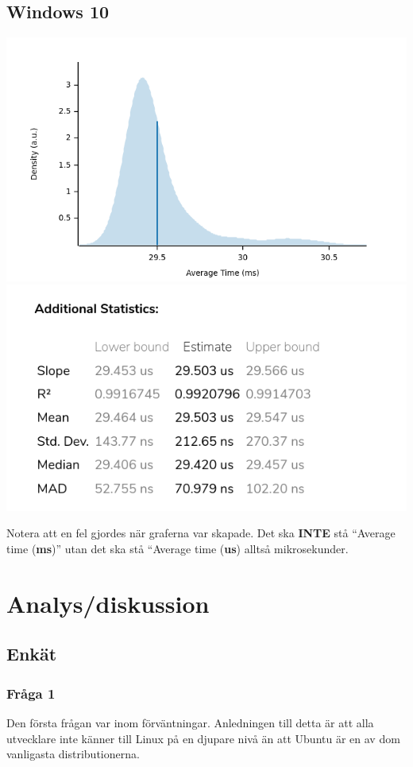 \documentclass[12pt, a4paper]{report}
\begin{document}
   \subsection{Windows 10}
   \includegraphics[width=1\textwidth]{bench_windows_average_time}
   \includegraphics[width=1\textwidth]{add_stats_windows}

   Notera att en fel gjordes när graferna var skapade. Det ska \textbf{INTE} stå ``Average time (\textbf{ms})'' utan det ska stå ``Average time (\textbf{us}) alltså mikrosekunder.

\section{Analys/diskussion}

\subsection{Enkät}

\subsubsection{Fråga 1}
Den första frågan var inom förväntningar. Anledningen till detta är att alla utvecklare inte känner till Linux på en djupare nivå än att Ubuntu är en av dom vanligasta distributionerna\cite{commondistro}.
\end{document}
